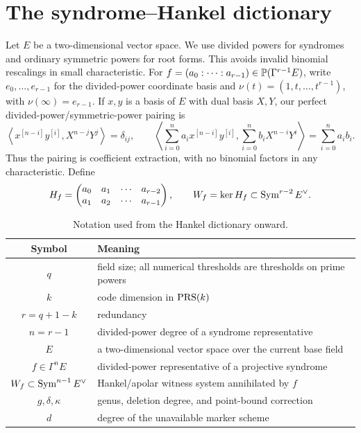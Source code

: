 \section{The syndrome--Hankel dictionary}\label{sec:dictionary}

Let $E$ be a two-dimensional vector space.  We use divided powers for
syndromes and ordinary symmetric powers for root forms.  This avoids
invalid binomial rescalings in small characteristic.  For
$f=(a_0:\cdots:a_{r-1})\in\mathbb P(\Gamma^{r-1}E)$, write
$e_0,\ldots,e_{r-1}$ for the divided-power coordinate basis and
$\nu(t)=(1,t,\ldots,t^{r-1})$, with
$\nu(\infty)=e_{r-1}$.  If \(x,y\) is a basis of \(E\) with dual
basis \(X,Y\), our perfect divided-power/symmetric-power pairing is
\[
 \left\langle x^{[n-i]}y^{[i]},X^{n-j}Y^j\right\rangle=\delta_{ij},
 \qquad
 \left\langle\sum_{i=0}^n a_i x^{[n-i]}y^{[i]},
                    \sum_{i=0}^n b_i X^{n-i}Y^i\right\rangle
       =\sum_{i=0}^n a_i b_i .
\]
Thus the pairing is coefficient extraction, with no binomial factors
in any characteristic.  Define
\[
 H_f=
 \begin{pmatrix}
 a_0&a_1&\cdots&a_{r-2}\\
 a_1&a_2&\cdots&a_{r-1}
 \end{pmatrix},\qquad
 W_f=\ker H_f\subset\operatorname{Sym}^{r-2}E^\vee.
\]

\begin{table}[ht]
\centering
\small
\caption{Notation used from the Hankel dictionary onward.}
\label{tab:notation}
\begin{tabular}{cl}
\toprule
Symbol & Meaning\\
\midrule
$q$ & field size; all numerical thresholds are thresholds on prime powers\\
$k$ & code dimension in $\operatorname{PRS}(k)$\\
$r=q+1-k$ & redundancy\\
$n=r-1$ & divided-power degree of a syndrome representative\\
$E$ & a two-dimensional vector space over the current base field\\
$f\in\Gamma^nE$ & divided-power representative of a projective syndrome\\
$W_f\subset\operatorname{Sym}^{n-1}E^\vee$ & Hankel/apolar witness system annihilated by $f$\\
$g,\delta,\kappa$ & genus, deletion degree, and point-bound correction\\
$d$ & degree of the unavailable marker scheme\\
\bottomrule
\end{tabular}
\end{table}

